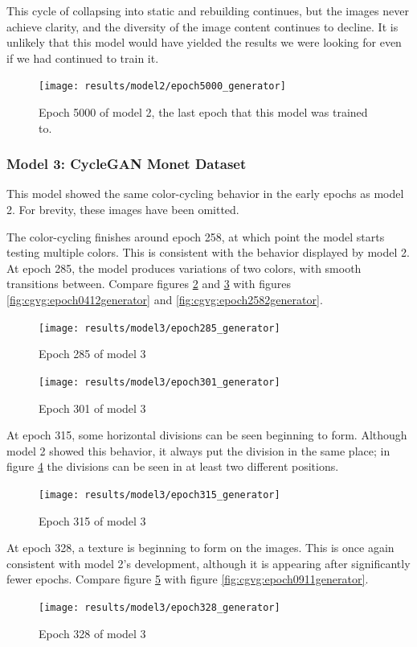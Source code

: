 \documentclass[11pt,letterpaper]{article}
\begin{document}
				This cycle of collapsing into static and rebuilding continues, but the images never achieve clarity, and the diversity of the image content continues to decline.
				It is unlikely that this model would have yielded the results we were looking for even if we had continued to train it.
				\begin{figure}
					\centering
					\texttt{[image: results/model2/epoch5000\_generator]}
					\caption{Epoch 5000 of model 2, the last epoch that this model was trained to.}
					\label{fig:cgvg:epoch5000generator}
				\end{figure}
			\subsubsection{Model 3: CycleGAN Monet Dataset}
				This model showed the same color-cycling behavior in the early epochs as model 2.
				For brevity, these images have been omitted.

				The color-cycling finishes around epoch 258, at which point the model starts testing multiple colors.
				This is consistent with the behavior displayed by model 2.
				At epoch 285, the model produces variations of two colors, with smooth transitions between.
				Compare figures \ref{fig:cgm:epoch285generator} and \ref{fig:cgm:epoch301generator} with figures \ref{fig:cgvg:epoch0412generator} and \ref{fig:cgvg:epoch2582generator}.
				\begin{figure}
					\centering
					\texttt{[image: results/model3/epoch285\_generator]}
					\caption{Epoch 285 of model 3}
					\label{fig:cgm:epoch285generator}
				\end{figure}
				\begin{figure}
					\centering
					\texttt{[image: results/model3/epoch301\_generator]}
					\caption{Epoch 301 of model 3}
					\label{fig:cgm:epoch301generator}
				\end{figure}

				At epoch 315, some horizontal divisions can be seen beginning to form.
				Although model 2 showed this behavior, it always put the division in the same place; in figure \ref{fig:cgm:epoch315generator} the divisions can be seen in at least two different positions.
				\begin{figure}
					\centering
					\texttt{[image: results/model3/epoch315\_generator]}
					\caption[]{Epoch 315 of model 3}
					\label{fig:cgm:epoch315generator}
				\end{figure}

				At epoch 328, a texture is beginning to form on the images.
				This is once again consistent with model 2's development, although it is appearing after significantly fewer epochs.
				Compare figure \ref{fig:cgm:epoch328generator} with figure \ref{fig:cgvg:epoch0911generator}.
				\begin{figure}
					\centering
					\texttt{[image: results/model3/epoch328\_generator]}
					\caption[]{Epoch 328 of model 3}
					\label{fig:cgm:epoch328generator}
				\end{figure}
\end{document}
